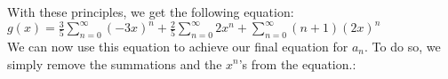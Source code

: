 \documentclass[11pt,twosided]{article}
\begin{document}
\begin{solution}
\noindent
With these principles, we get the following equation:\\

$g(x) = \frac{3}{5}\sum_{n = 0}^\infty (-3x)^n + \frac{2}{5}\sum_{n = 0}^\infty 2x^n + \sum_{n = 0}^\infty (n + 1)(2x)^n$\\

\noindent
We can now use this equation to achieve our final equation for $a_n$. To do so, we simply remove the summations and the $x^n$'s from the equation.:\\


\end{solution} \\
\end{document}
